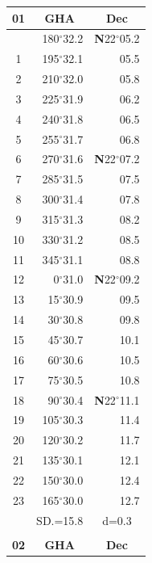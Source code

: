 \documentclass[10pt, a4paper]{report}
\begin{document}
\begin{scriptsize}
\noindent
\begin{tabular*}{0.2\textwidth}[t]{@{\extracolsep{\fill}}|c|rr|}
\hline
\multicolumn{1}{|c|}{\rule{0pt}{2.6ex}\textbf{01}} & \multicolumn{1}{c}{\textbf{GHA}} & \multicolumn{1}{c|}{\textbf{Dec}}\\
\hline\rule{0pt}{2.6ex}\noindent
0 & 180$^\circ$32.2 & \textbf{N}22$^\circ$05.2\\
1 & 195$^\circ$32.1 & 05.5\\
2 & 210$^\circ$32.0 & 05.8\\
3 & 225$^\circ$31.9 & \raisebox{0.24ex}{\boldmath$\cdot$~\boldmath$\cdot$~~}06.2\\
4 & 240$^\circ$31.8 & 06.5\\
5 & 255$^\circ$31.7 & 06.8\\[2Pt]
6 & 270$^\circ$31.6 & \textbf{N}22$^\circ$07.2\\
7 & 285$^\circ$31.5 & 07.5\\
8 & 300$^\circ$31.4 & 07.8\\
9 & 315$^\circ$31.3 & \raisebox{0.24ex}{\boldmath$\cdot$~\boldmath$\cdot$~~}08.2\\
10 & 330$^\circ$31.2 & 08.5\\
11 & 345$^\circ$31.1 & 08.8\\[2Pt]
12 & 0$^\circ$31.0 & \textbf{N}22$^\circ$09.2\\
13 & 15$^\circ$30.9 & 09.5\\
14 & 30$^\circ$30.8 & 09.8\\
15 & 45$^\circ$30.7 & \raisebox{0.24ex}{\boldmath$\cdot$~\boldmath$\cdot$~~}10.1\\
16 & 60$^\circ$30.6 & 10.5\\
17 & 75$^\circ$30.5 & 10.8\\[2Pt]
18 & 90$^\circ$30.4 & \textbf{N}22$^\circ$11.1\\
19 & 105$^\circ$30.3 & 11.4\\
20 & 120$^\circ$30.2 & 11.7\\
21 & 135$^\circ$30.1 & \raisebox{0.24ex}{\boldmath$\cdot$~\boldmath$\cdot$~~}12.1\\
22 & 150$^\circ$30.0 & 12.4\\
23 & 165$^\circ$30.0 & 12.7\\
\hline
\rule{0pt}{2.4ex} & \multicolumn{1}{c}{SD.=15.8} & \multicolumn{1}{c|}{d=0.3}\\
\hline
\multicolumn{1}{c}{}\\[-0.5ex]\hline
\multicolumn{1}{|c|}{\rule{0pt}{2.6ex}\textbf{02}} & \multicolumn{1}{c}{\textbf{GHA}} & \multicolumn{1}{c|}{\textbf{Dec}}\\

\end{tabular*}
\end{scriptsize}
\end{document}
